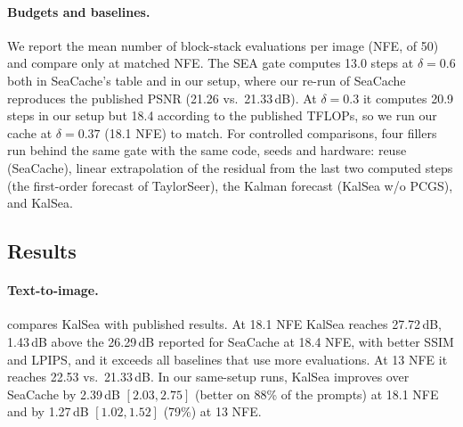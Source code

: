 \paragraph{Budgets and baselines.} We report the mean number of block-stack evaluations per image (NFE, of 50) and compare only at matched NFE. The SEA gate computes 13.0 steps at $\delta=0.6$ both in SeaCache's table and in our setup, where our re-run of SeaCache reproduces the published PSNR (21.26 vs.\ 21.33\,dB). At $\delta=0.3$ it computes 20.9 steps in our setup but 18.4 according to the published TFLOPs, so we run our cache at $\delta=0.37$ (18.1 NFE) to match. For controlled comparisons, four fillers run behind the same gate with the same code, seeds and hardware: reuse (SeaCache), linear extrapolation of the residual from the last two computed steps (the first-order forecast of TaylorSeer), the Kalman forecast (KalSea w/o PCGS), and KalSea.

\subsection{Results}\label{sec:kalsea-results}

\paragraph{Text-to-image.}  compares KalSea with published results. At 18.1 NFE KalSea reaches 27.72\,dB, 1.43\,dB above the 26.29\,dB reported for SeaCache at 18.4 NFE, with better SSIM and LPIPS, and it exceeds all baselines that use more evaluations. At 13 NFE it reaches 22.53 vs.\ 21.33\,dB. In our same-setup runs, KalSea improves over SeaCache by 2.39\,dB $[2.03,2.75]$ (better on 88\% of the prompts) at 18.1 NFE and by 1.27\,dB $[1.02,1.52]$ (79\%) at 13 NFE.

